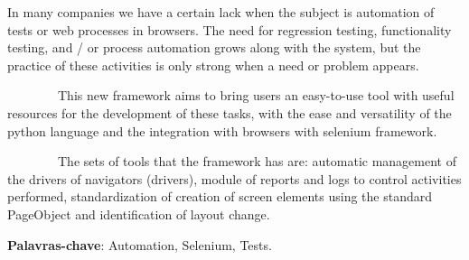 %
%

\begin{ABSTRACT}
	\begin{SingleSpace}


        In many companies we have a certain lack when the subject is automation of tests or web processes in browsers.
        The need for regression testing, functionality testing, and / or process automation grows along with the system,
        but the practice of these activities is only strong when a need or problem appears.

        This new framework aims to bring users an easy-to-use tool with useful resources for the development of these
        tasks, with the ease and versatility of the python language and the integration with browsers with selenium framework.

        The sets of tools that the framework has are: automatic management of the drivers of navigators (drivers), module of
        reports and logs to control activities performed, standardization of creation of screen elements using the standard
        PageObject and identification of layout change.

		\vspace*{0.5cm}\hspace{-1.3 cm}\textbf{Palavras-chave}: Automation, Selenium, Tests.


	\end{SingleSpace}

\end{ABSTRACT}
